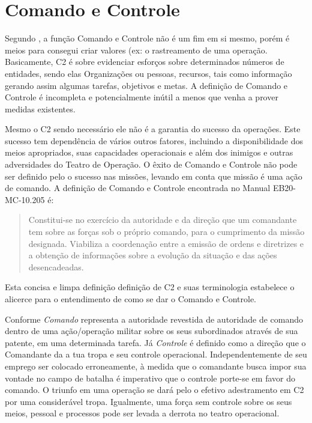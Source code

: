 \section*{Comando e Controle}

\hspace{1.5cm}
Segundo \cite{undestanding2006}, a função Comando e Controle não é um fim em si mesmo, porém é meios para consegui criar valores (ex: o rastreamento de uma operação. Basicamente, C2 é sobre evidenciar esforços sobre determinados números de entidades, sendo elas Organizações ou pessoas, recursos, tais como informação gerando assim algumas tarefas, objetivos e metas. A definição de Comando e Controle é  incompleta e potencialmente inútil a menos que venha a prover medidas existentes. 

\hspace{1.5cm}
Mesmo o C2 sendo necessário ele não é a garantia do sucesso da operações. Este sucesso tem dependência de vários outros fatores, incluindo a disponibilidade dos meios apropriados, suas capacidades operacionais e além dos inimigos e outras adversidades do Teatro de Operação. O êxito de Comando e Controle não pode ser definido pelo o sucesso nas missões, levando em conta que missão é uma ação de comando.
A definição de Comando e Controle encontrada no Manual EB20-MC-10.205 é:
\begin{quote}
 Constitui-se  no  exercício  da  autoridade  e  da  direção que um comandante tem sobre as forças sob o próprio comando, para o cumprimento da missão  designada.  Viabiliza  a  coordenação  entre  a  emissão  de  ordens  e  diretrizes  e  a  obtenção de informações sobre a evolução da situação e das ações desencadeadas. \cite{comandoecontrole2015}
\end{quote}
Esta concisa e limpa definição definição de C2 e suas terminologia estabelece o alicerce para o entendimento de como se dar o Comando e Controle. 

\hspace{1.5cm}
Conforme  \cite{comandoecontrole2015} \textit{Comando} representa a autoridade revestida de autoridade de comando dentro de uma ação/operação militar sobre os seus subordinados através de sua patente, em uma determinada tarefa. Já \textit{Controle}  é definido como a direção que o Comandante da a tua tropa e seu controle operacional. Independentemente de seu emprego ser colocado erroneamente, à medida que o comandante busca impor sua vontade no campo de batalha é imperativo que o controle porte-se em favor do comando. O triunfo em uma operação se dará pelo o efetivo adestramento em C2 por uma considerável tropa. Igualmente, uma força sem controle sobre os seus meios, pessoal e processos pode ser levada a derrota no teatro operacional. 

